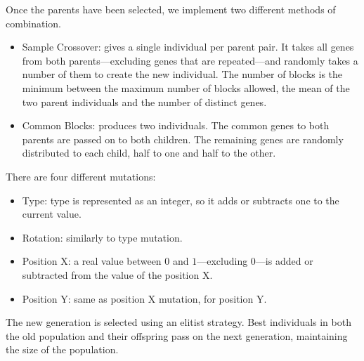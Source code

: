 \documentclass[runningheads,a4paper]{llncs}
\begin{document}
Once the parents have been selected, we implement two different methods of 
combination.
\begin{itemize}
	\item Sample Crossover: gives a single individual per parent pair. It takes 
	all genes from both parents---excluding genes that are repeated---and 
	randomly takes a number of them to create the new individual. The number of 
	blocks is the minimum between the maximum number of blocks allowed, the 
	mean of the two parent individuals and the number of distinct genes.
	\item Common Blocks: produces two individuals. The common genes to both 
	parents are passed on to both children. The remaining genes are randomly 
	distributed to each child, half to one and half to the other. 
	\label{ga:cross2}
\end{itemize}

There are four different mutations:

\begin{itemize}
	\item Type: type is represented as an integer, so it adds or subtracts one 
	to the current value.
	\item Rotation: similarly to type mutation.
	\item Position X: a real value between $0$ and $1$---excluding $0$---is 
	added or subtracted from the value of the position X.
	\item Position Y: same as position X mutation, for position Y.
\end{itemize}

The new generation is selected using an elitist strategy. Best individuals in 
both the old population and their offspring pass on the next generation, 
maintaining the size of the population.





\end{document}
